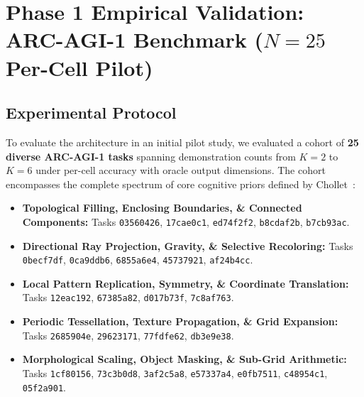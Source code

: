 \documentclass[11pt,a4paper]{article}
\theoremstyle{plain}
\theoremstyle{definition}
\theoremstyle{remark}
\begin{document}
\section{Phase 1 Empirical Validation: ARC-AGI-1 Benchmark ($N = 25$ Per-Cell Pilot)}
\label{sec:phase1_experiments}

\subsection{Experimental Protocol}

To evaluate the architecture in an initial pilot study, we evaluated a cohort of \textbf{25 diverse ARC-AGI-1 tasks} spanning demonstration counts from $K = 2$ to $K = 6$ under per-cell accuracy with oracle output dimensions. The cohort encompasses the complete spectrum of core cognitive priors defined by Chollet~\cite{chollet2019arc}:
\begin{itemize}
    \item \textbf{Topological Filling, Enclosing Boundaries, \& Connected Components:} Tasks \texttt{03560426}, \texttt{17cae0c1}, \texttt{ed74f2f2}, \texttt{b8cdaf2b}, \texttt{b7cb93ac}.
    \item \textbf{Directional Ray Projection, Gravity, \& Selective Recoloring:} Tasks \texttt{0becf7df}, \texttt{0ca9ddb6}, \texttt{6855a6e4}, \texttt{45737921}, \texttt{af24b4cc}.
    \item \textbf{Local Pattern Replication, Symmetry, \& Coordinate Translation:} Tasks \texttt{12eac192}, \texttt{67385a82}, \texttt{d017b73f}, \texttt{7c8af763}.
    \item \textbf{Periodic Tessellation, Texture Propagation, \& Grid Expansion:} Tasks \texttt{2685904e}, \texttt{29623171}, \texttt{77fdfe62}, \texttt{db3e9e38}.
    \item \textbf{Morphological Scaling, Object Masking, \& Sub-Grid Arithmetic:} Tasks \texttt{1cf80156}, \texttt{73c3b0d8}, \texttt{3af2c5a8}, \texttt{e57337a4}, \texttt{e0fb7511}, \texttt{c48954c1}, \texttt{05f2a901}.
\end{itemize}
\end{document}
